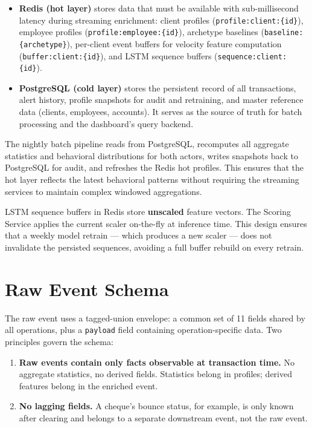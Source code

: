 \begin{itemize}[leftmargin=2cm]
    \item \textbf{Redis (hot layer)} stores data that must be available with
          sub-millisecond latency during streaming enrichment: client profiles
          (\texttt{profile:client:\{id\}}), employee profiles
          (\texttt{profile:employee:\{id\}}), archetype baselines
          (\texttt{baseline:\{archetype\}}), per-client event buffers for velocity
          feature computation (\texttt{buffer:client:\{id\}}), and LSTM sequence
          buffers (\texttt{sequence:client:\{id\}}).

    \item \textbf{PostgreSQL (cold layer)} stores the persistent record of all
          transactions, alert history, profile snapshots for audit and retraining,
          and master reference data (clients, employees, accounts). It serves as
          the source of truth for batch processing and the dashboard's query backend.
\end{itemize}

The nightly batch pipeline reads from PostgreSQL, recomputes all aggregate statistics
and behavioral distributions for both actors, writes snapshots back to PostgreSQL for
audit, and refreshes the Redis hot profiles. This ensures that the hot layer reflects
the latest behavioral patterns without requiring the streaming services to maintain
complex windowed aggregations.

LSTM sequence buffers in Redis store \textbf{unscaled} feature vectors. The Scoring
Service applies the current scaler on-the-fly at inference time. This design ensures
that a weekly model retrain --- which produces a new scaler --- does not invalidate
the persisted sequences, avoiding a full buffer rebuild on every retrain.

\section{Raw Event Schema}

The raw event uses a tagged-union envelope: a common set of 11 fields shared by all
operations, plus a \texttt{payload} field containing operation-specific data. Two
principles govern the schema:

\begin{enumerate}[leftmargin=2cm]
    \item \textbf{Raw events contain only facts observable at transaction time.}
          No aggregate statistics, no derived fields. Statistics belong in profiles;
          derived features belong in the enriched event.
    \item \textbf{No lagging fields.} A cheque's bounce status, for example, is only
          known after clearing and belongs to a separate downstream event, not the
          raw event.
\end{enumerate}

